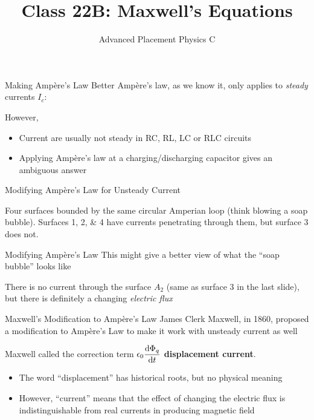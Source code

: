 \documentclass[12pt,aspectratio=169]{beamer}
\title{Class 22B: Maxwell's Equations}
\subtitle{Advanced Placement Physics C}
\begin{document}
\begin{frame}
  \maketitle
\end{frame}


\begin{frame}{Making Amp\`{e}re's Law Better}
  Amp\`{e}re's law, as we know it, only applies to \emph{steady} currents $I_c$:

  However,
  \begin{itemize}
  \item Current are usually not steady in RC, RL, LC or RLC circuits
  \item Applying Amp\`{e}re's law at a charging/discharging capacitor gives an
    ambiguous answer
  \end{itemize}
\end{frame}



\begin{frame}{Modifying Amp\`{e}re's Law for Unsteady Current}
  \begin{center}
  \end{center}
  Four surfaces bounded by the same circular Amperian loop
  (think blowing a soap bubble). Surfaces \numlist{1;2;4} have currents
  penetrating through them, but surface \num{3} does not.
\end{frame}



\begin{frame}{Modifying Amp\`{e}re's Law}
  This might give a better view of what the ``soap bubble'' looks like
  \begin{center}
  \end{center}
  There is no current through the surface $A_2$ (same as surface \num{3} in the
  last slide), but there is definitely a changing \emph{electric flux}
\end{frame}



\begin{frame}{Maxwell's Modification to Amp\`{e}re's Law}
  James Clerk Maxwell, in 1860, proposed a modification to Amp\`{e}re's Law
  to make it work with unsteady current as well



  Maxwell called the correction term $\displaystyle\epsilon_0\diff{\Phi_q}t$
  \textbf{displacement current}.
  \begin{itemize}
  \item The word ``displacement'' has historical roots, but no physical meaning
  \item However, ``current'' means that the effect of changing the electric
    flux is indistinguishable from real currents in producing magnetic field
  \end{itemize}
\end{frame}
\end{document}
